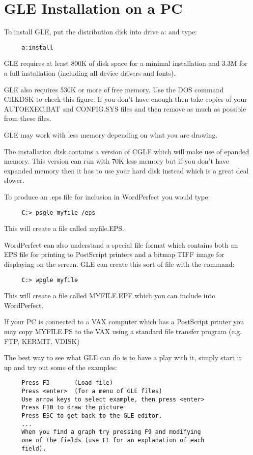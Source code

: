 \section{GLE Installation on a PC}
To install GLE, put the distribution disk into drive a: and
type:
\begin{verbatim}
     a:install
\end{verbatim}

GLE requires at least 800K of disk space for a minimal installation
and 3.3M for a full installation (including all device drivers
and fonts).

GLE also requires 530K or more of free memory. Use the DOS
command CHKDSK to check this figure. If you don't have
enough then take copies of your AUTOEXEC.BAT and CONFIG.SYS files
and then remove as much as possible from these files.

GLE may work with less memory depending on what you are drawing.

The installation disk contains a version of CGLE which will
make use of epanded memory.  This version can run with 70K less
memory but if you don't have expanded memory then it has to
use your hard disk instead which is a great deal slower.

To produce an .eps file for inclusion in WordPerfect you would type:
\begin{verbatim}
     C:> psgle myfile /eps
\end{verbatim}
This will create a file called myfile.EPS.

WordPerfect can also understand a special file format which contains
both an EPS file for printing to PostScript printers and a bitmap  TIFF
image for displaying on the screen.  GLE can create this sort of
file with the command:
\begin{verbatim}
     C:> wpgle myfile
\end{verbatim}
This will create a file called MYFILE.EPF which you can include into
WordPerfect.

If your PC is connected to a VAX computer which has a PostScript printer
you may copy MYFILE.PS to the VAX using a standard file transfer
program (e.g. FTP, KERMIT, VDISK)

The best way to see what GLE can do is to have a play with it, simply
start it up and try out some of the examples:
\begin{verbatim}
     Press F3       (Load file)
     Press <enter>  (for a menu of GLE files)
     Use arrow keys to select example, then press <enter>
     Press F10 to draw the picture
     Press ESC to get back to the GLE editor.
     ...
     When you find a graph try pressing F9 and modifying
     one of the fields (use F1 for an explanation of each
     field).
\end{verbatim}

